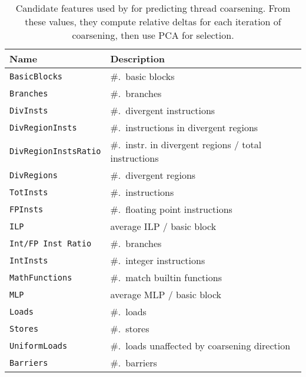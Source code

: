 \begin{table}
  \centering%
    \begin{tabular}{| l l |}
      \hline
      \rowcolor{gray!50}
      \textbf{Name} & \textbf{Description} \\
      \hline
      \texttt{BasicBlocks} & \#.\ basic blocks \\
      \texttt{Branches} & \#.\ branches \\
      \texttt{DivInsts} & \#.\ divergent instructions \\
      \texttt{DivRegionInsts} & \#.\ instructions in divergent regions \\
      \texttt{DivRegionInstsRatio} & \#.\ instr. in divergent regions / total instructions \\
      \texttt{DivRegions} & \#.\ divergent regions \\
      \texttt{TotInsts} & \#.\ instructions \\
      \texttt{FPInsts} & \#.\ floating point instructions \\
      \texttt{ILP} & average ILP / basic block \\
      \texttt{Int/FP Inst Ratio} & \#.\ branches \\
      \texttt{IntInsts} & \#.\ integer instructions \\
      \texttt{MathFunctions} & \#.\ match builtin functions \\
      \texttt{MLP} & average MLP / basic block \\
      \texttt{Loads} & \#.\ loads \\
      \texttt{Stores} & \#.\ stores \\
      \texttt{UniformLoads} & \#.\ loads unaffected by coarsening direction \\
      \texttt{Barriers} & \#.\ barriers \\
      \hline
    \end{tabular}%
    \label{tab:features-pact14-raw}%
  \caption[\citeauthor{Magni2014}features for predicting thread coarsening]{%
    Candidate features used by \citeauthor{Magni2014}for predicting thread
    coarsening. From these values, they compute relative deltas for each
    iteration of coarsening, then use PCA for selection.%
  }%
  \label{tab:magni-features} %
\end{table}
